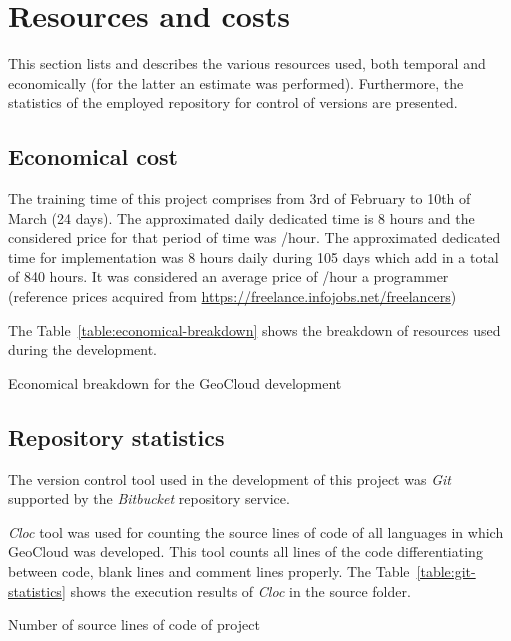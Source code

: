 \section{Resources and costs}

This section lists and describes the various resources used, both temporal 
and economically (for the latter an estimate was performed). Furthermore, the
statistics of the employed repository for control of versions are presented.

\subsection{Economical cost}

The training time of this project comprises from 3rd of February to 10th of
March (24 days). The approximated daily dedicated time is 8 hours and the considered price for that period of time was /hour. The approximated dedicated time for implementation was 8 hours daily
during 105 days which add in a total of 840 hours. It was considered an average
price of /hour a programmer (reference prices acquired from
\url{https://freelance.infojobs.net/freelancers})

The Table~\ref{table:economical-breakdown} shows the breakdown of resources used during the development.


\begin{table}[hp]
  \centering
  {\small
  
  }
  \caption{Economical breakdown for the GeoCloud development}
  \label{table:economical-breakdown}
\end{table}

\subsection{Repository statistics}

The version control tool used in the development of this project was \emph{Git}
supported by the \emph{Bitbucket} repository service.

\emph{Cloc} tool was used for counting the source lines of code of all languages in which
GeoCloud was developed. This tool counts all lines of the code differentiating
between code, blank lines and comment lines properly. The Table~\ref{table:git-statistics} shows the
execution results of \emph{Cloc} in the source folder.

\begin{table}[hp]
  \centering
  {\small
  
  }
  \caption{Number of source lines of code of project}
  \label{table:git-statistics}
\end{table}
